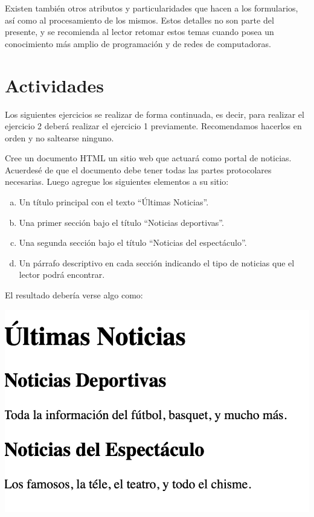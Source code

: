 Existen también otros atributos y particularidades que hacen a los formularios,
así como al procesamiento de los mismos. Estos detalles no son parte del presente,
y se recomienda al lector retomar estos temas cuando posea un conocimiento más
amplio de programación y de redes de computadoras.

\section{Actividades}

Los siguientes ejercicios se realizar de forma continuada, es decir, para
realizar el ejercicio 2 deberá realizar el ejercicio 1 previamente. Recomendamos
hacerlos en orden y no saltearse ninguno.

\begin{exercise}
Cree un documento HTML un sitio web que actuará como portal de noticias.
Acuerdesé de que el documento debe tener todas las partes protocolares
necesarias. Luego agregue los siguientes elementos a su sitio:
\begin{enumerate}[a)]
  \item Un título principal con el texto ``Últimas Noticias''.
  \item Una primer sección bajo el título ``Noticias deportivas''.
  \item Una segunda sección bajo el título ``Noticias del espectáculo''.
  \item Un párrafo descriptivo en cada sección indicando el tipo de noticias que
    el lector podrá encontrar.
\end{enumerate}

El resultado debería verse algo como:

\includegraphics[scale=0.5]{apendices/html/imagenes/diario_1.png}
\end{exercise}

